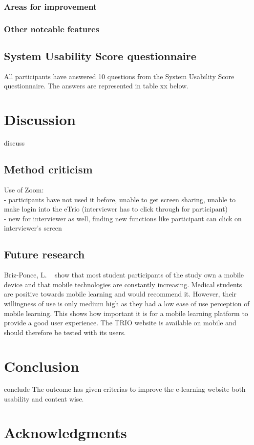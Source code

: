 \documentclass{sigchi}
\begin{document}
\subsubsection{Areas for improvement}
\subsubsection{Other noteable features}


\subsection{System Usability Score questionnaire}
All participants have answered 10 questions from the System Usability Score questionnaire. The answers are represented in table xx below. 

\section{Discussion}
discuss

\subsection{Method criticism}
Use of Zoom:\\
- participants have not used it before, unable to get screen sharing, unable to make login into the eTrio (interviewer has to click through for participant)\\
- new for interviewer as well, finding new functions like participant can click on interviewer's screen

\subsection{Future research}
Briz-Ponce, L. ~\cite{Briz-Ponce2017} show that most student participants of the study own a mobile device and that mobile technologies are constantly increasing. Medical students are positive towards mobile learning and would recommend it. However, their willingness of use is only medium high as they had a low ease of use perception of mobile learning. This shows how important it is for a mobile learning platform to provide a good user experience. The TRIO website is available on mobile and should therefore be tested with its users. 

\section{Conclusion}
conclude
The outcome has given criterias to improve the e-learning website both usability and content wise.
 
\section{Acknowledgments}

\balance{}



\end{document}
